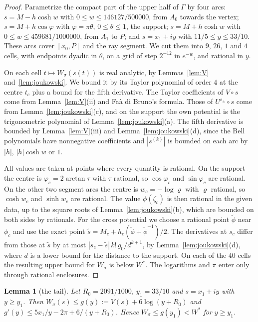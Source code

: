 \documentclass[11pt]{amsart}
\newtheorem{lemma}[theorem]{Lemma}
\theoremstyle{definition}
\theoremstyle{remark}
\numberwithin{equation}{section}
\begin{document}
\begin{proof}
Parametrize the compact part of the upper half of $\Gamma$ by four arcs: $s=M-h\cosh w$ with
$0\le w\le146127/500000$, from $A_0$ towards the vertex; $s=M+h\cos\varphi$ with $\varphi=\pi\theta$, $0\le\theta\le1$, the
support; $s=M+h\cosh w$ with $0\le w\le459681/1000000$, from $A_1$ to $P$; and $s=x_1+iy$ with $11/5\le y\le33/10$. These
arcs cover $[x_0,P]$ and the ray segment. We cut them into $9$, $26$, $1$ and $4$ cells, with endpoints dyadic in
$\theta$, on a grid of step $2^{-12}$ in $e^{-w}$, and rational in $y$.

On each cell $t\mapsto W_\sigma(s(t))$ is real analytic, by Lemmas~\ref{lem:V} and~\ref{lem:joukowski}. We bound it by its
Taylor polynomial of order $4$ at the centre $t_c$ plus a bound for the fifth derivative. The Taylor coefficients of
$V\circ s$ come from Lemma~\ref{lem:V}(ii) and Fa\`a di Bruno's formula. Those of $U^{s_\pm}\circ s$ come from
Lemma~\ref{lem:joukowski}(c), and on the support the own potential is the trigonometric polynomial of
Lemma~\ref{lem:joukowski}(a). The fifth derivative is bounded by Lemma~\ref{lem:V}(iii) and Lemma~\ref{lem:joukowski}(d),
since the Bell polynomials have nonnegative coefficients and $|s^{(k)}|$ is bounded on each arc by $|h|$,
$|h|\cosh w$ or $1$.

All values are taken at points where every quantity is rational. On the support the centre is
$\varphi_c=2\arctan\tau$ with $\tau$ rational, so $\cos\varphi_c$ and $\sin\varphi_c$ are rational. On the other two
segment arcs the centre is $w_c=-\log\varrho$ with $\varrho$ rational, so $\cosh w_c$ and $\sinh w_c$ are rational. The
value $\phi(\zeta_c)$ is then rational in the given data, up to the square roots of Lemma~\ref{lem:joukowski}(b), which
are bounded on both sides by rationals. For the cross potential we choose a rational point $\tilde\phi$ near $\phi_c$ and
use the exact point $\tilde s=M_c+h_c(\tilde\phi+\tilde\phi^{-1})/2$. The derivatives at $s_c$ differ from those at
$\tilde s$ by at most $|s_c-\tilde s|\,k!\,g_0/d^{k+1}$, by Lemma~\ref{lem:joukowski}(d), where $d$ is a lower bound for
the distance to the support. On each of the $40$ cells the resulting upper bound for $W_\sigma$ is below $W^*$. The
logarithms and $\pi$ enter only through rational enclosures.
\end{proof}

\begin{lemma}[the tail]\label{lem:tail}
Let $R_0=2091/1000$, $y_1=33/10$ and $s=x_1+iy$ with $y\ge y_1$. Then $W_\sigma(s)\le g(y):=V(s)+6\log(y+R_0)$ and
$g'(y)\le5x_1/y-2\pi+6/(y+R_0)$. Hence $W_\sigma\le g(y_1)<W^*$ for $y\ge y_1$.
\end{lemma}
\end{document}
